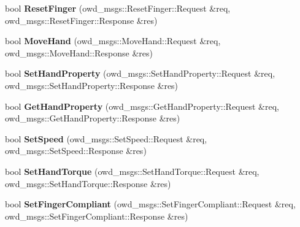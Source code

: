 \begin{DoxyCompactItemize}
\item 
\hypertarget{classBHD__280_aa8d3b3b88b4112f0edfc0f7a8cffa5f2}{bool {\bfseries Reset\-Finger} (owd\-\_\-msgs\-::\-Reset\-Finger\-::\-Request \&req, owd\-\_\-msgs\-::\-Reset\-Finger\-::\-Response \&res)}\label{classBHD__280_aa8d3b3b88b4112f0edfc0f7a8cffa5f2}

\item 
\hypertarget{classBHD__280_a60d69abe8de227277e9754e474554f02}{bool {\bfseries Move\-Hand} (owd\-\_\-msgs\-::\-Move\-Hand\-::\-Request \&req, owd\-\_\-msgs\-::\-Move\-Hand\-::\-Response \&res)}\label{classBHD__280_a60d69abe8de227277e9754e474554f02}

\item 
\hypertarget{classBHD__280_a117dfaf15f4b744e024f35b0c0911d79}{bool {\bfseries Set\-Hand\-Property} (owd\-\_\-msgs\-::\-Set\-Hand\-Property\-::\-Request \&req, owd\-\_\-msgs\-::\-Set\-Hand\-Property\-::\-Response \&res)}\label{classBHD__280_a117dfaf15f4b744e024f35b0c0911d79}

\item 
\hypertarget{classBHD__280_a3e12d4c8cfa0cb9c023591529c0dc042}{bool {\bfseries Get\-Hand\-Property} (owd\-\_\-msgs\-::\-Get\-Hand\-Property\-::\-Request \&req, owd\-\_\-msgs\-::\-Get\-Hand\-Property\-::\-Response \&res)}\label{classBHD__280_a3e12d4c8cfa0cb9c023591529c0dc042}

\item 
\hypertarget{classBHD__280_ad6abd7d0b20c18b82e5b258fc302a5ad}{bool {\bfseries Set\-Speed} (owd\-\_\-msgs\-::\-Set\-Speed\-::\-Request \&req, owd\-\_\-msgs\-::\-Set\-Speed\-::\-Response \&res)}\label{classBHD__280_ad6abd7d0b20c18b82e5b258fc302a5ad}

\item 
\hypertarget{classBHD__280_a27643d0148e7336f4fa3bc6c36d76c01}{bool {\bfseries Set\-Hand\-Torque} (owd\-\_\-msgs\-::\-Set\-Hand\-Torque\-::\-Request \&req, owd\-\_\-msgs\-::\-Set\-Hand\-Torque\-::\-Response \&res)}\label{classBHD__280_a27643d0148e7336f4fa3bc6c36d76c01}

\item 
\hypertarget{classBHD__280_a592c5a105b46d434427632365f29cd3d}{bool {\bfseries Set\-Finger\-Compliant} (owd\-\_\-msgs\-::\-Set\-Finger\-Compliant\-::\-Request \&req, owd\-\_\-msgs\-::\-Set\-Finger\-Compliant\-::\-Response \&res)}\label{classBHD__280_a592c5a105b46d434427632365f29cd3d}

\end{DoxyCompactItemize}
